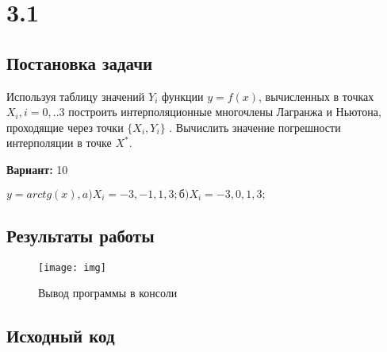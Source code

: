 \section* {3.1}

\subsection{Постановка задачи}
Используя таблицу значений $Y_i$  функции $y=f(x)$, вычисленных в точках   $X_i, i=0,..3$  построить интерполяционные многочлены Лагранжа и Ньютона, проходящие через точки $\{X_i,Y_i \}$ .  Вычислить значение погрешности интерполяции в точке $X^*$. 

{\bfseries Вариант:} 10

$y=arctg(x), a)X_i= -3,-1,1,3;  б)X_i= -3,0,1,3;$

\subsection{Результаты работы}
\begin{figure}[h!]
\centering
\texttt{[image: img]}
\caption{Вывод программы в консоли}
\end{figure}
\pagebreak


\subsection{Исходный код}
% 

% 
% 
% 